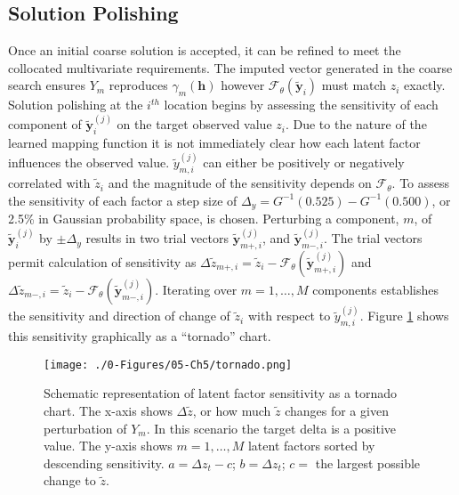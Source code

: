 \subsection{Solution Polishing}
\label{subsec:polish}

Once an initial coarse solution is accepted, it can be refined to meet the collocated multivariate requirements. The imputed vector generated in the coarse search ensures $Y_{m}$ reproduces $\gamma_{m}(\mathbf{h})$ however $\mathcal{F}_{\theta}(\tilde{\mathbf{y}}_{i})$ must match $z_{i}$ exactly. Solution polishing at the $i^{th}$ location begins by assessing the sensitivity of each component of  $\tilde{\mathbf{y}}_{i}^{(j)}$ on the target observed value $z_{i}$. Due to the nature of the learned mapping function it is not immediately clear how each latent factor influences the observed value. $\tilde{y}_{m, i}^{(j)}$ can either be positively or negatively correlated with $\tilde{z}_{i}$ and the magnitude of the sensitivity depends on $\mathcal{F}_{\theta}$. To assess the sensitivity of each factor a step size of $\Delta_{y} = G^{-1}(0.525)-G^{-1}(0.500)$, or 2.5\% in Gaussian probability space, is chosen. Perturbing a component, $m$, of $\tilde{\mathbf{y}}^{(j)}_{i}$ by $\pm \Delta_{y}$ results in two trial vectors $\tilde{\mathbf{y}}_{m+, i}^{(j)}$, and $\tilde{\mathbf{y}}_{m-,i}^{(j)}$. The trial vectors permit calculation of sensitivity as  $\Delta\tilde{z}_{m+,i} = \tilde{z}_{i} - \mathcal{F}_{\theta}(\tilde{\mathbf{y}}_{m+, i}^{(j)})$ and $\Delta\tilde{z}_{m-,i} = \tilde{z}_{i} - \mathcal{F}_{\theta}(\tilde{\mathbf{y}}_{m-,i}^{(j)})$. Iterating over $m=1,\dots,M$ components establishes the sensitivity and direction of change of $\tilde{z}_{i}$ with respect to $\tilde{y}_{m, i}^{(j)}$. Figure \ref{fig:tornado} shows this sensitivity graphically as a ``tornado'' chart.

\begin{figure}[htb!]
    \centering
    \texttt{[image: ./0-Figures/05-Ch5/tornado.png]}
    \caption{Schematic representation of latent factor sensitivity as a tornado chart. The x-axis shows $\Delta \tilde{z}$, or how much $\tilde{z}$ changes for a given perturbation of $Y_{m}$. In this scenario the target delta is a positive value. The y-axis shows $m=1,\dots,M$ latent factors sorted by descending sensitivity. $a = \Delta z_{t} - c$; $b=\Delta z_{t}$; $c=$ the largest possible change to $\tilde{z}$.}
    \label{fig:tornado}
\end{figure}

